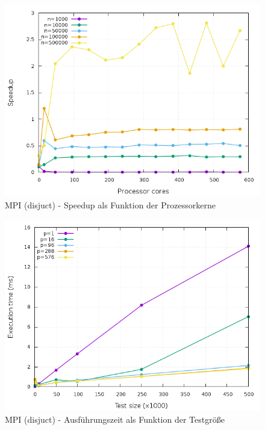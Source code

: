 \begin{figure}[p]
	\centering
	\includegraphics[width=404pt]{resources/plots/MPI_Disjunct_sizes.png}
	\caption{MPI (disjuct) - Speedup als Funktion der Prozessorkerne}
	\label{MPI_Disjunct_sizes}
\end{figure}

\begin{figure}[p]
	\centering
	\includegraphics[width=404pt]{resources/plots/MPI_Disjunct_cores.png}
	\caption{MPI (disjuct) - Ausführungszeit als Funktion der Testgröße}
	\label{MPI_Disjunct_cores}
\end{figure}

